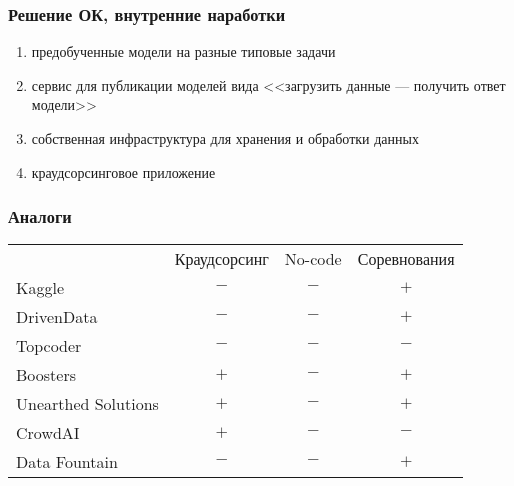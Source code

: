 \begin{frame}
\frametitle{Решение ОК, внутренние наработки}
\begin{enumerate}
    \item предобученные модели на разные типовые задачи
    \item сервис для публикации моделей вида <<загрузить данные --- получить ответ модели>>
    \item собственная инфраструктура для хранения и обработки данных
    \item краудсорсинговое приложение
\end{enumerate}
\end{frame}

\begin{frame}
\frametitle{Аналоги}
\begin{tabular}{lccc}
    & Краудсорсинг & No-code & Соревнования \\
    Kaggle              & $-$ & $-$ & $+$ \\
    DrivenData          & $-$ & $-$ & $+$ \\
    Topcoder            & $-$ & $-$ & $-$ \\ %
    Boosters            & $+$ & $-$ & $+$ \\
    Unearthed Solutions & $+$ & $-$ & $+$ \\ %
    CrowdAI             & $+$ & $-$ & $-$ \\
    Data Fountain       & $-$ & $-$ & $+$ \\
\end{tabular}
\end{frame}
